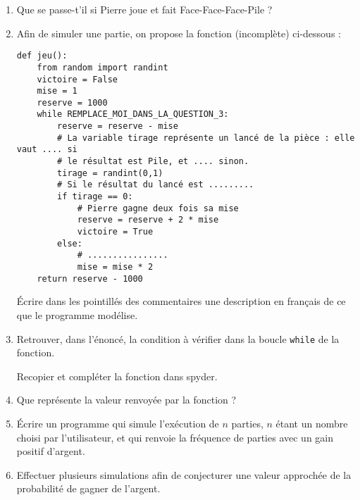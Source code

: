 \documentclass[
	classe=$2^{de}$
]{informatique}
\begin{document}
\begin{enumerate}
	\item Que se passe-t'il si Pierre joue et fait Face-Face-Face-Pile ?
	\item Afin de simuler une partie, on propose la fonction (incomplète) ci-dessous :
	      \begin{lstlisting}
def jeu():
	from random import randint
	victoire = False
	mise = 1
	reserve = 1000
	while REMPLACE_MOI_DANS_LA_QUESTION_3:
		reserve = reserve - mise
		# La variable tirage représente un lancé de la pièce : elle vaut .... si
		# le résultat est Pile, et .... sinon.
		tirage = randint(0,1)
		# Si le résultat du lancé est .........
		if tirage == 0:
			# Pierre gagne deux fois sa mise
			reserve = reserve + 2 * mise
			victoire = True
		else:
			# ................
			mise = mise * 2
	return reserve - 1000
\end{lstlisting}


	      Écrire dans les pointillés des commentaires une description en français de ce que le programme modélise.

	\item Retrouver, dans l'énoncé, la condition à vérifier dans la boucle \texttt{while} de la fonction.

	      Recopier et compléter la fonction dans spyder.
	\item Que représente la valeur renvoyée par la fonction ?
	
	\item Écrire un programme qui simule l'exécution de $n$ parties, $n$ étant un nombre choisi par l’utilisateur, et qui renvoie la fréquence de parties avec un gain positif d’argent.
	\item Effectuer plusieurs simulations afin de conjecturer une valeur approchée de la probabilité de gagner de l'argent.
\end{enumerate}
\end{document}
